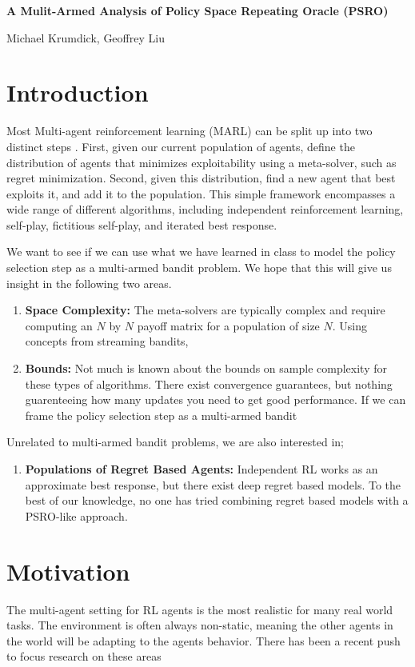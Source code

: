 \documentclass{article}
\begin{document}
\noindent \large\textbf{A Mulit-Armed Analysis of Policy Space Repeating Oracle
(PSRO)}

\noindent \large Michael Krumdick, Geoffrey Liu

\section{Introduction}
Most Multi-agent reinforcement learning (MARL) can be split up into two
distinct steps \cite{PSRO}. First, given our current population of agents,
define the distribution of agents that minimizes exploitability using a
meta-solver, such as regret minimization. Second, given this distribution, find
a new agent that best exploits it, and add it to the population. This simple
framework encompasses a wide range of different algorithms, including
independent reinforcement learning, self-play, fictitious self-play, and
iterated best response. 

We want to see if we can use what we have learned in class to model the policy
selection step as a multi-armed bandit problem. We hope that this will give us
insight in the following two areas.

\begin{enumerate}
	\item \textbf{Space Complexity:} The meta-solvers are typically complex and
        require computing an $N$ by $N$ payoff matrix for a population of size
        $N$. Using concepts from streaming bandits, 
	\item \textbf{Bounds:} Not much is known about the bounds on sample
        complexity for these types of algorithms. There exist convergence
        guarantees, but nothing guarenteeing how many updates you need to get
        good performance. If we can frame the policy selection step as a
        multi-armed bandit 
\end{enumerate}

Unrelated to multi-armed bandit problems, we are also interested in;
\begin{enumerate}
	\item \textbf{Populations of Regret Based Agents:} Independent RL works as an approximate best
        response, but there exist deep regret based models. To the best of our
        knowledge, no one has tried combining regret based models with a
        PSRO-like approach.
\end{enumerate}

\section{Motivation}
The multi-agent setting for RL agents is the most realistic for many real world
tasks. The environment is often always non-static, meaning the other agents in
the world will be adapting to the agents behavior. There has been a recent push
to focus research on these areas
\end{document}
